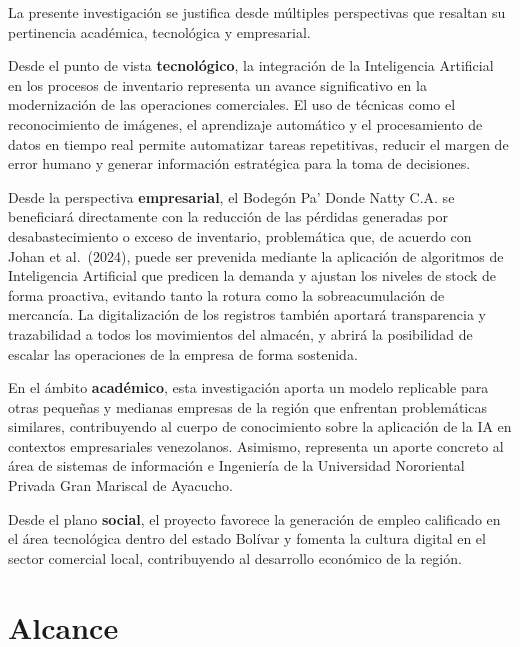 \documentclass[12pt, letterpaper]{report}
\begin{document}
La presente investigación se justifica desde múltiples perspectivas que
resaltan su pertinencia académica, tecnológica y empresarial.

Desde el punto de vista \textbf{tecnológico}, la integración de la
Inteligencia Artificial en los procesos de inventario representa un
avance significativo en la modernización de las operaciones comerciales.
El uso de técnicas como el reconocimiento de imágenes, el aprendizaje
automático y el procesamiento de datos en tiempo real permite automatizar
tareas repetitivas, reducir el margen de error humano y generar
información estratégica para la toma de decisiones.

Desde la perspectiva \textbf{empresarial}, el Bodegón Pa' Donde Natty
C.A. se beneficiará directamente con la reducción de las pérdidas
generadas por desabastecimiento o exceso de inventario, problemática que,
de acuerdo con Johan et al.\ (2024), puede ser prevenida mediante la
aplicación de algoritmos de Inteligencia Artificial que predicen la
demanda y ajustan los niveles de stock de forma proactiva, evitando
tanto la rotura como la sobreacumulación de mercancía. La digitalización
de los registros también aportará transparencia y trazabilidad a todos
los movimientos del almacén, y abrirá la posibilidad de escalar las
operaciones de la empresa de forma sostenida.

En el ámbito \textbf{académico}, esta investigación aporta un modelo
replicable para otras pequeñas y medianas empresas de la región que
enfrentan problemáticas similares, contribuyendo al cuerpo de
conocimiento sobre la aplicación de la IA en contextos empresariales
venezolanos. Asimismo, representa un aporte concreto al área de sistemas
de información e Ingeniería de la Universidad Nororiental Privada Gran
Mariscal de Ayacucho.

Desde el plano \textbf{social}, el proyecto favorece la generación de
empleo calificado en el área tecnológica dentro del estado Bolívar y
fomenta la cultura digital en el sector comercial local, contribuyendo
al desarrollo económico de la región.

\section{Alcance}
\end{document}
